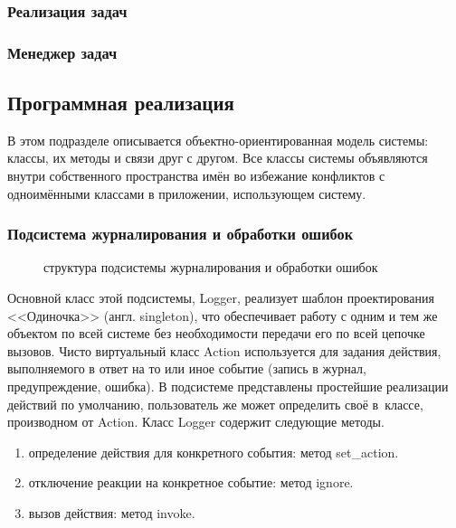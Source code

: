 \documentclass[a4paper, 14pt, titlepage]{extarticle}
\newcommand{\eng}[1]{{\English #1}}
\newcommand{\includefigure}[2]{
    \begin{figure}[!htb]
      \center{\texttt{[image: \#1]}}
      \caption{#2} \label{fig:#1}
    \end{figure}
  }
\begin{document}
      \subsubsection{Реализация задач}
      \subsubsection{Менеджер задач}

    \subsection{Программная реализация}\label{ssec:implementation}

      В этом подразделе описывается объектно-ориентированная модель системы: классы, их методы и
      связи друг с другом. Все классы системы объявляются внутри собственного пространства имён во
      избежание конфликтов с одноимёнными классами в приложении, использующем систему.

      \subsubsection{Подсистема журналирования и обработки ошибок}
        \includefigure{logging}{структура подсистемы журналирования и обработки ошибок}

        Основной класс этой подсистемы, Logger, реализует шаблон проектирования <<Одиночка>> (англ.
        \eng{singleton}), что обеспечивает работу с одним и тем же объектом по всей системе без
        необходимости передачи его по всей цепочке вызовов. Чисто виртуальный класс Action
        используется для задания действия, выполняемого в ответ на то или иное событие (запись в
        журнал, предупреждение, ошибка). В подсистеме представлены простейшие реализации действий по
        умолчанию, пользователь же может определить своё в~классе, производном от Action. Класс
        Logger содержит следующие методы.
        \begin{enumerate}
          \item определение действия для конкретного события: метод set\_action.
          \item отключение реакции на конкретное событие: метод ignore.
          \item вызов действия: метод invoke.
        \end{enumerate}
\end{document}
